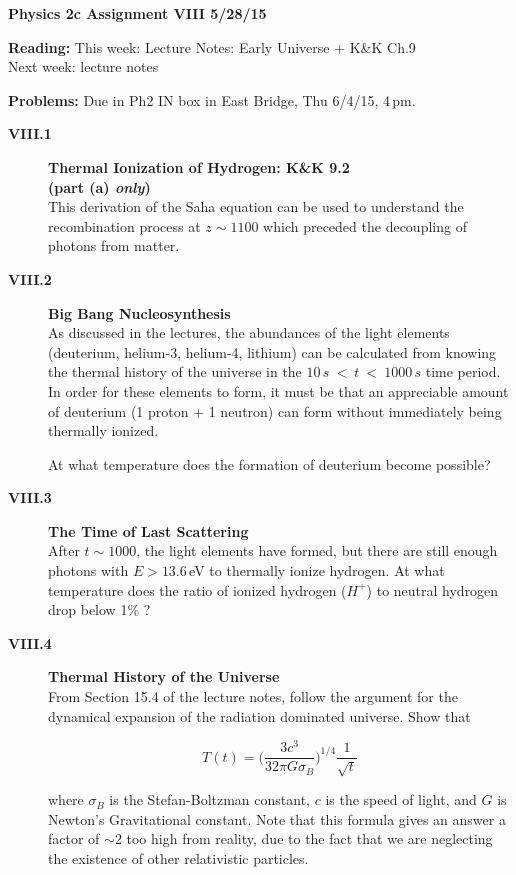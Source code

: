 \documentclass[11pt]{article}
\begin{document}
%
\centerline{\large\bf Physics 2c \hfill Assignment VIII \hfill  5/28/15}

\medskip
\begin{list}{}{\leftmargin 2.4cm  .2cm }
\item[{\bf Reading:}  \hfill ] This week: Lecture Notes: Early Universe + K\&K Ch.9 \\
                              Next week: lecture notes
\item[{\bf Problems:} \hfill ] Due in Ph2 IN box in East Bridge, Thu 6/4/15, 4\,pm.
\end{list}

\begin{description}

\item[{\bf VIII.1} ] {\bf Thermal Ionization of Hydrogen: K\&K 9.2} \\
\textbf{(part (a) \emph{only})}\\
This derivation of the Saha equation can be used to understand the
recombination process at $z \sim 1100$ which preceded the decoupling
of photons from matter.


\item[{\bf VIII.2} ] {\bf Big Bang Nucleosynthesis}\\
As discussed in the lectures, the abundances of the light elements
(deuterium, helium-3, helium-4, lithium) can be calculated from knowing
the thermal history of the universe in the $10\,s~<~t~<~1000\,s$ time
period. In order for these elements to form, it must be that an
appreciable amount of deuterium (1 proton + 1 neutron) can form
without immediately being thermally ionized.

At what temperature does the formation of deuterium become possible?



\item[{\bf VIII.3} ] {\bf The Time of Last Scattering}\\
After $t \sim 1000$, the light elements have formed,
but there are still enough photons with $E > 13.6$\,eV to thermally
ionize hydrogen. At what temperature does the ratio of ionized hydrogen 
($H^{+}$) to neutral hydrogen drop below 1\% ?


\item[{\bf VIII.4} ] {\bf Thermal History of the Universe} \\
From Section 15.4 of the lecture notes, follow the argument for the
dynamical expansion of the radiation dominated universe. Show that

\begin{equation}
T(t) = \bigg(\frac{3 c^3}{32 \pi G \sigma_B}\bigg)^{1/4} \frac{1}{\sqrt{t}}
\end{equation}

where $\sigma_B$ is the Stefan-Boltzman constant, $c$ is the speed of light, and $G$ is Newton's Gravitational constant. Note that this formula gives an answer a factor of $\sim$2 too high from reality, due to the fact that we are neglecting the existence of other relativistic particles.

\end{description}
\end{document}
